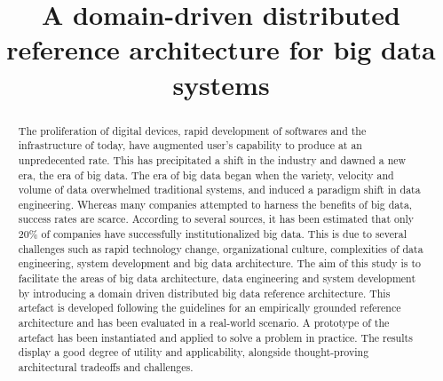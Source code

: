 \documentclass[runningheads]{llncs}
\begin{document}
%
\title{A domain-driven distributed reference architecture for big data systems}
%
%
%
%
%
\maketitle              %
%
\begin{abstract}
    The proliferation of digital devices, rapid development of softwares and the infrastructure of today, have augmented user’s capability to produce at an unpredecented
    rate. This has precipitated a shift in the industry and dawned a new era, the era of
    big data. The era of big data began when the variety, velocity and volume of data
    overwhelmed traditional systems, and induced a paradigm shift in data engineering.
    Whereas many companies attempted to harness the benefits of big data, success rates
    are scarce. According to several sources, it has been estimated that only 20\% of companies have successfully institutionalized big data. This is due to several challenges such
    as rapid technology change, organizational culture, complexities of data engineering,
    system development and big data architecture. The aim of this study is to facilitate
    the areas of big data architecture, data engineering and system development by introducing a domain driven distributed big data reference architecture. This artefact is
    developed following the guidelines for an empirically grounded reference architecture
    and has been evaluated in a real-world scenario. A prototype of the artefact has been
    instantiated and applied to solve a problem in practice. The results display a good degree of utility and applicability, alongside thought-proving architectural tradeoffs and
    challenges.

\end{abstract}
%
%
%
\end{document}
